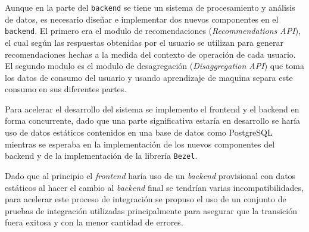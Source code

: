 Aunque en la parte del \texttt{backend} se tiene un sistema de procesamiento
y análisis de datos, es necesario diseñar e implementar dos nuevos componentes
en el \texttt{backend}. El primero era el modulo de recomendaciones
(\textit{Recommendations API}), el cual según las respuestas obtenidas por el
usuario se utilizan para generar recomendaciones hechas a la medida del
contexto de operación de cada usuario. El segundo modulo es el modulo de
desagregación (\textit{Disaggregation API}) que toma los datos de consumo
del usuario y usando aprendizaje de maquina separa este consumo en sus
diferentes partes. %

Para acelerar el desarrollo del sistema se implemento el frontend y el backend
en forma concurrente, dado que una parte significativa estaría en desarrollo
se haría uso de datos estáticos contenidos en una base de datos como PostgreSQL
mientras se esperaba en la implementación de los nuevos componentes del backend
y de la implementación de la librería \texttt{Bezel}.

Dado que al principio el \textit{frontend} haría uso de un \textit{backend}
provisional con datos estáticos al hacer el cambio al \textit{backend} final
se tendrían varias incompatibilidades, para acelerar este proceso de integración
se propuso el uso de un conjunto de pruebas de integración utilizadas
principalmente para asegurar que la transición fuera exitosa y con la menor
cantidad de errores.


